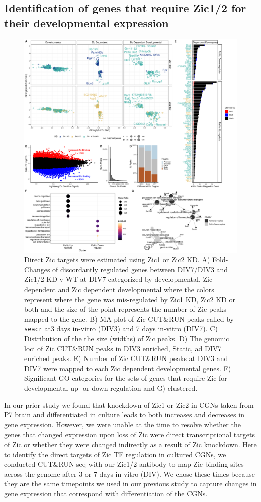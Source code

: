 \documentclass[fleqn,10pt]{wlscirep}
\begin{document}
\subsection*{Identification of genes that require Zic1/2 for their developmental expression}
\begin{figure}[!ht]
\includegraphics[width=.95\textwidth]{../figures/figure4.png}
\caption{Direct Zic targets were estimated using Zic1 or Zic2 KD. A) Fold-Changes of discordantly regulated genes between DIV7/DIV3 and Zic1/2 KD v WT at DIV7 categorized by developmental, Zic dependent and Zic dependent developmental where the colors represent where the gene was mis-regulated by Zic1 KD, Zic2 KD or both and the size of the point represents the number of Zic peaks mapped to the gene. B) MA plot of Zic CUT\&RUN peaks called by \texttt{seacr} at3 days in-vitro (DIV3) and 7 days in-vitro (DIV7). C) Distribution of the the size (widths) of Zic peaks. D) The genomic loci of Zic CUT\&RUN peaks in DIV3 enriched, Static, ad DIV7 enriched peaks.  E) Number of Zic CUT\&RUN peaks at DIV3 and DIV7 were mapped to each Zic dependent developmental genes. F) Significant GO categories for the sets of genes that require Zic for developmental up- or down-regulation and G) clustered. }
\label{fig:ZicKD}
\end{figure}

In our prior study we found that knockdown of Zic1 or Zic2 in CGNs taken from P7 brain and differentiated in culture leads to both increases and decreases in gene expression. However, we were unable at the time to resolve whether the genes that changed expression upon loss of Zic were direct transcriptional targets of Zic or whether they were changed indirectly as a result of Zic knockdown. Here to identify the direct targets of Zic TF regulation in cultured CGNs, we conducted CUT\&RUN-seq with our Zic1/2 antibody to map Zic binding sites across the genome after 3 or 7 days in-vitro (DIV). We chose these times because they are the same timepoints we used in our previous study to capture changes in gene expression that correspond with differentiation of the CGNs.
\end{document}
